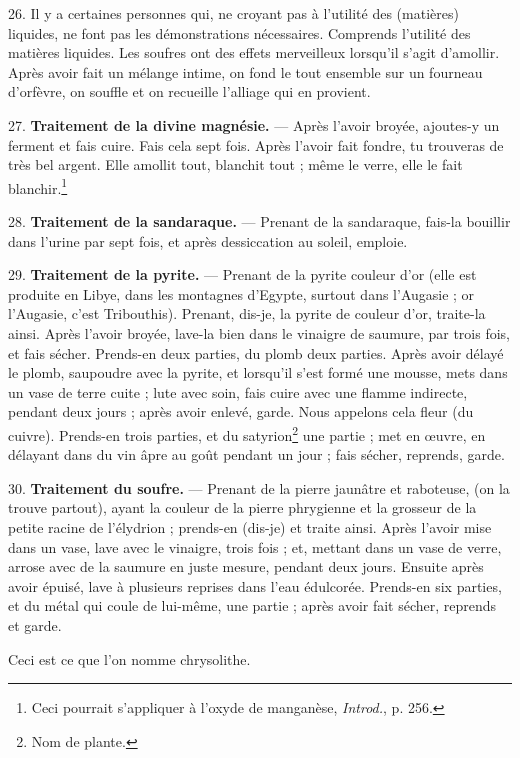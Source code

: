\documentclass[a4paper, 11pt, oneside, polutonikogreek, french]{article}
\begin{document}
26. Il y a certaines personnes qui, ne croyant pas à l'utilité des (matières) liquides, ne font pas les démonstrations nécessaires. Comprends l'utilité des matières liquides. Les soufres ont des effets merveilleux lorsqu'il s'agit d'amollir. Après avoir fait un mélange intime, on fond le tout ensemble sur un fourneau d'orfèvre, on souffle et on recueille l'alliage qui en provient.

27. \textbf{Traitement de la divine magnésie.} --- Après l'avoir broyée, ajoutes-y un ferment et fais cuire. Fais cela sept fois. Après l'avoir fait fondre, tu trouveras de très bel argent. Elle amollit tout, blanchit tout ; même le verre, elle le fait blanchir.\footnote{Ceci pourrait s'appliquer à l'oxyde de manganèse, \emph{Introd.}, p. 256.}

28. \textbf{Traitement de la sandaraque.} --- Prenant de la sandaraque, fais-la bouillir dans l'urine par sept fois, et après dessiccation au soleil, emploie.

29. \textbf{Traitement de la pyrite.} --- Prenant de la pyrite couleur d'or (elle est produite en Libye, dans les montagnes d'Egypte, surtout dans l'Augasie ; or l'Augasie, c'est Tribouthis). Prenant, dis-je, la pyrite de couleur d'or, traite-la ainsi. Après l'avoir broyée, lave-la bien dans le vinaigre de saumure, par trois fois, et fais sécher. Prends-en deux parties, du plomb deux parties. Après avoir délayé le plomb, saupoudre avec la pyrite, et lorsqu'il s'est formé une mousse, mets dans un vase de terre cuite ; lute avec soin, fais cuire avec une flamme indirecte, pendant deux jours ; après avoir enlevé, garde. Nous appelons cela fleur (du cuivre). Prends-en trois parties, et du satyrion\footnote{Nom de plante.} une partie ; met en œuvre, en délayant dans du vin âpre au goût pendant un jour ; fais sécher, reprends, garde.

30. \textbf{Traitement du soufre.} --- Prenant de la pierre jaunâtre et raboteuse, (on la trouve partout), ayant la couleur de la pierre phrygienne et la grosseur de la petite racine de l'élydrion ; prends-en (dis-je) et traite ainsi. Après l'avoir mise dans un vase, lave avec le vinaigre, trois fois ; et, mettant dans un vase de verre, arrose avec de la saumure en juste mesure, pendant deux jours. Ensuite après avoir épuisé, lave à plusieurs reprises dans l'eau édulcorée. Prends-en six parties, et du métal qui coule de lui-même, une partie ; après avoir fait sécher, reprends et garde.

Ceci est ce que l'on nomme chrysolithe.
\end{document}

